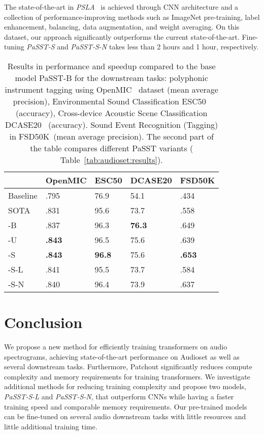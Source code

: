 \documentclass[a4paper]{article}
\begin{document}
The state-of-the-art in \emph{PSLA}~\cite{gong_psla}  is achieved through CNN architecture and a collection of performance-improving methods such as ImageNet pre-training, label enhancement, balancing, data augmentation, and weight averaging.
On this dataset, our approach significantly outperforms the current state-of-the-art. Fine-tuning \emph{PaSST-S} and \emph{PaSST-S-N} takes less than 2 hours and 1 hour, respectively.

\begin{table}[ht]
\centering
\begin{tabular}{l|l|l|l|l}
     & OpenMIC & ESC50 &  DCASE20 & FSD50K  \\ \hline
Baseline &   .795~\cite{humphrey2018openmic} &     76.9~\cite{piczak2015dataset}  & 54.1~\cite{Heittola2020}& .434~\cite{fonsecaFPFS22FSD50K}  \\ 
SOTA&  .831~\cite{koutini21journal}  &    95.6~\cite{gong21ast}      &   73.7~\cite{Suh2020task1a}  & .558~\cite{gong_psla} \\ \hline
-B     &.837 &96.3&\textbf{76.3}& .649\\
-U  & \textbf{.843}  & 96.5& 75.6&.639  \\ 
-S  & \textbf{.843}  &\textbf{96.8}&  75.6  & \textbf{.653} \\ 
-S-L  & .841 &  95.5&  73.7 & .584 \\ 
-S-N  & .840  & 96.4&  73.9 & .637 \\ 
\hline 
\end{tabular}
\caption{Results in performance and speedup compared to the base model PaSST-B for the downstream tasks: polyphonic instrument tagging using OpenMIC~\cite{humphrey2018openmic} dataset (mean average precision),  Environmental Sound Classification ESC50~\cite{piczak2015dataset} (accuracy), Cross-device Acoustic Scene Classification DCASE20~\cite{Heittola2020} (accuracy). Sound Event Recognition (Tagging) in FSD50K~\cite{fonsecaFPFS22FSD50K}(mean average precision). The second part of the table compares different PaSST variants ( Table~\ref{tab:audioset:results}).}
\label{tab:finetune:results}
\end{table}


\section{Conclusion}
\label{sec:conclusion}
We propose a new method for efficiently training transformers on audio spectrograms, achieving state-of-the-art performance on Audioset as well as several downstream tasks. Furthermore, Patchout significantly reduces compute complexity and memory requirements for training transformers.
We investigate additional methods for reducing training complexity and propose two models, \emph{PaSST-S-L} and \emph{PaSST-S-N}, that outperform CNNs while having a faster training speed and comparable memory requirements.
Our pre-trained models can be fine-tuned on several audio downstream tasks with little resources and little additional training time.
\end{document}
